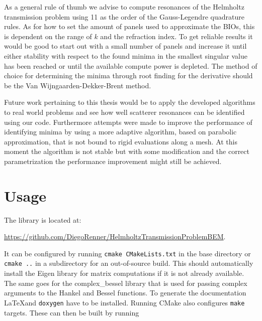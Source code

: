 \documentclass[a4paper, oneside]{thirdparty_stylesheets/discothesis}
\begin{document}
As a general rule of thumb we advise to compute resonances of the Helmholtz transmission problem using 11 as the order of the Gauss-Legendre quadrature rules.
As for how to set the amount of panels used to approximate the BIOs, this is dependent on the range of $k$ and the refraction index.
To get reliable results it would be good to start out with a small number of panels and increase it until either stability with respect to the found minima in the smallest singular value has been reached or until the available compute power is depleted.
The method of choice for determining the minima through root finding for the derivative should be the Van Wijngaarden-Dekker-Brent method. 

Future work pertaining to this thesis would be to apply the developed algorithms to real world problems and see how well scatterer resonances can be identified using our code.
Furthermore attempts were made to improve the performance of identifying minima by using a more adaptive algorithm, based on parabolic approximation, that is not bound to rigid evaluations along a mesh.
At this moment the algorithm is not stable but with some modification and the correct parametrization the performance improvement might still be achieved.




\appendix
\chapter{Usage} \label{chap:usage}
The library is located at:

\url{https://github.com/DiegoRenner/HelmholtzTransmissionProblemBEM}.

It can be configured by running \verb|cmake CMakeLists.txt| in the base directory
or \verb|cmake ..| in a subdirectory for an out-of-source build.
This should automatically install the Eigen library \cite{eigenweb} for matrix computations if it is not already available.
The same goes for the complex\_bessel library \cite{cb} that is used for passing complex arguments to the Hankel and Bessel functions.
To generate the documentation \LaTeX and \verb|doxygen| have to be installed.
Running CMake also configures \verb|make| targets.
These can then be built by running 
\end{document}
